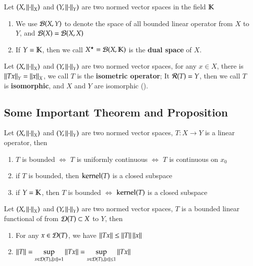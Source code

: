 \begin{definition}\label{def:2.4}
Let $(X, \Norm{\cdot}_X)$ and $(Y, \Norm{\cdot}_Y)$ are two normed vector spaces in the field $\mathbb{K}$
\begin{enumerate}[itemsep=0pt, topsep=0pt]
    \item We use $\mathcal{B}(X, Y)$ to denote the space of all bounded linear operator from $X$ to $Y$, and $\mathcal{B}(X) = \mathcal{B}(X, X)$
    \item If $Y = \mathbb{K}$, then we call $X^{\star} = \mathcal{B}(X, \mathbb{K})$ is the \textbf{dual space} of $X$.
\end{enumerate}
\end{definition}

\begin{definition}\label{def:2.5}
Let $(X, \Norm{\cdot}_X)$ and $(Y, \Norm{\cdot}_Y)$ are two normed vector spaces, for any $x \in X$, there is $\Norm{Tx}_Y = \Norm{x}_X$, we call $T$ is the \textbf{isometric operator}; It $\mathcal{R}(T) = Y$, then we call $T$ is \textbf{isomorphic}, and $X$ and $Y$ are isomorphic ().
\end{definition}

\subsection{Some Important Theorem and Proposition}
\begin{theorem}\label{thm:2.6}
Let $(X, \Norm{\cdot}_X)$ and $(Y, \Norm{\cdot}_Y)$ are two normed vector spaces, $T: X \to Y$ is a linear operator, then
\begin{enumerate}[itemsep=0pt, topsep=0pt]
    \item $T$ is bounded $\Leftrightarrow$ $T$ is uniformly continuous $\Leftrightarrow$ $T$ is continuous on $x_0$
    \item if $T$ is bounded, then $\operatorname{kernel}(T)$ is a closed subspace
    \item if $Y = \mathbb{K}$, then $T$ is bounded $\Leftrightarrow$ $\operatorname{kernel}(T)$ is a closed subspace
\end{enumerate}
\end{theorem}

\begin{theorem}\label{thm:2.7}
Let $(X, \Norm{\cdot}_X)$ and $(Y, \Norm{\cdot}_Y)$ are two normed vector spaces, $T$ is a bounded linear functional of from $\mathcal{D}(T) \subset X$ to  $Y$, then 
\begin{enumerate}[itemsep=0pt, topsep=0pt]
    \item For any $x \in \mathcal{D}(T)$, we have $\Norm{Tx} \leq \Norm{T}\Norm{x}$
    \item $\Norm{T} = \sup\limits_{x \in \elD(T), \Norm{x} = 1} \Norm{Tx} = \sup\limits_{x \in \elD(T), \Norm{x} \leq 1} \Norm{Tx}$
\end{enumerate}
\end{theorem}

